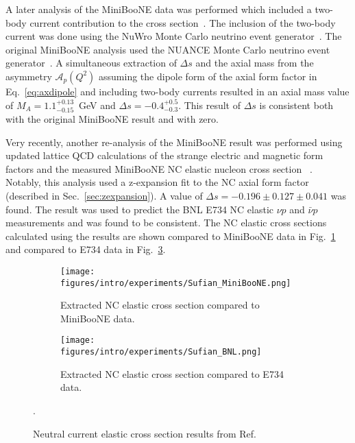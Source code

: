   A later analysis of the MiniBooNE data was performed which included a
  two-body current contribution to the cross section~\cite{Golan:2013jtj}.  The
  inclusion of the two-body current was done using the NuWro Monte Carlo
  neutrino event generator~\cite{Golan:2012wx}. The original MiniBooNE analysis
  used the NUANCE Monte Carlo neutrino event generator~\cite{Casper:2002sd}. A
  simultaneous extraction of $\Delta s$ and the axial mass from the asymmetry
  $\mathcal{A}_p(Q^2)$ assuming the dipole form of the axial form factor in
  Eq.~\ref{eq:axdipole} and including two-body currents resulted in an axial
  mass value of $M_A = 1.1^{+0.13}_{-0.15}$~GeV and $\Delta s =
  -0.4^{+0.5}_{-0.3}$. This result of $\Delta s$ is consistent both with the
  original MiniBooNE result and with zero.

  Very recently, another re-analysis of the MiniBooNE result was performed
  using updated lattice QCD calculations of the strange electric and magnetic
  form factors and the measured MiniBooNE NC elastic nucleon cross section
  ~\cite{Sufian:2018qtw}. Notably, this analysis used a z-expansion fit to the
  NC axial form factor (described in Sec.~\ref{sec:zexpansion}). A value of
  $\Delta s = -0.196\pm 0.127\pm 0.041$ was found. The result was used to
  predict the BNL E734 NC elastic $\nu p$ and $\bar{\nu} p$ measurements and
  was found to be consistent. The NC elastic cross sections calculated using the
  results are shown compared to MiniBooNE data in Fig.~\ref{fig:sufianuboone}
  and compared to E734 data in Fig.~\ref{fig:sufiane734}.
  \begin{figure}[h]
    \centering
    \begin{subfigure}[t]{2.5in}
      \texttt{[image: figures/intro/experiments/Sufian\_MiniBooNE.png]}
      \caption{Extracted NC elastic cross section compared to MiniBooNE data.}
      \label{fig:sufianuboone}
    \end{subfigure}
    \hspace{2pt}
    \begin{subfigure}[t]{2.5in}
      \texttt{[image: figures/intro/experiments/Sufian\_BNL.png]}
      \caption{Extracted NC elastic cross section compared to E734 data.}
      \label{fig:sufiane734}
    \end{subfigure}
    \caption{Neutral current elastic cross section results from
    Ref.~\cite{Sufian:2018qtw}}.
    \label{fig:sufiane734}
  \end{figure}


